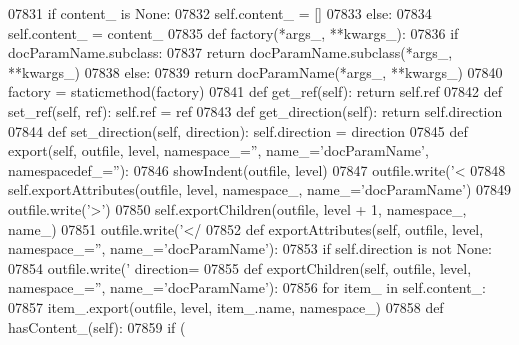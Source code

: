 \begin{DoxyCode}
{{{{{{{{{{{{{{{{{{{{{{{{{{{{{{{{{{{{{{{{{{{{{{{{{{{{{{{{{{{{{{{{{{{{{{{{{{{{{{{{{{{{{{{{{{{{{{{{{{{{{{{{{{{{{{{{{{{{{{{{{{{{{{{{{{{{{{{{{{{{{{{{{{{{{{{{{{{{{{{{{{{{{{{{{{{{{{{{{{{{{{{{{{{{{{{{{{{{{{{{{{{{{{{{{{{{{{{{{{{{{{{{{{{{{{{{{{{{{{{{{{{{{{{{{{{{{{{{{{{{{{{{{{{{{{{{{{{{{{{{{{{{{{{{{{{{{{{{{{{{{{{{{{{{{{{{{{{{{{{{{{{{{{{{{{{{{{{{{{{{{{{{{{{{{{{{{{{{{{{{{{{{{{{{{{{{{{{{{{{{{{{{{{{{{{{{{{{{{{{{{{{{{{{{{{{{{{{{{{{{{{{{{{{{{{{{{{{{{{{{{{{{{{{{{{{{{{{{{{{{{{{{{{{{{{{{{{{{{{{{{{07831         \textcolor{keywordflow}{if} content\_ \textcolor{keywordflow}{is} \textcolor{keywordtype}{None}:
07832             self.content_ = []
07833         \textcolor{keywordflow}{else}:
07834             self.content_ = content\_
07835     \textcolor{keyword}{def }factory(*args\_, **kwargs\_):
07836         \textcolor{keywordflow}{if} docParamName.subclass:
07837             \textcolor{keywordflow}{return} docParamName.subclass(*args\_, **kwargs\_)
07838         \textcolor{keywordflow}{else}:
07839             \textcolor{keywordflow}{return} docParamName(*args\_, **kwargs\_)
07840     factory = staticmethod(factory)
07841     \textcolor{keyword}{def }get_ref(self): \textcolor{keywordflow}{return} self.ref
07842     \textcolor{keyword}{def }set_ref(self, ref): self.ref = ref
07843     \textcolor{keyword}{def }get_direction(self): \textcolor{keywordflow}{return} self.direction
07844     \textcolor{keyword}{def }set_direction(self, direction): self.direction = direction
07845     \textcolor{keyword}{def }export(self, outfile, level, namespace\_='', name\_='docParamName', namespacedef\_=''):
07846         showIndent(outfile, level)
07847         outfile.write(\textcolor{stringliteral}{'<%
07848         self.exportAttributes(outfile, level, namespace\_, name\_=\textcolor{stringliteral}{'docParamName'})
07849         outfile.write(\textcolor{stringliteral}{'>'})
07850         self.exportChildren(outfile, level + 1, namespace\_, name\_)
07851         outfile.write(\textcolor{stringliteral}{'</%
07852     \textcolor{keyword}{def }exportAttributes(self, outfile, level, namespace\_='', name\_='docParamName'):
07853         \textcolor{keywordflow}{if} self.direction \textcolor{keywordflow}{is} \textcolor{keywordflow}{not} \textcolor{keywordtype}{None}:
07854             outfile.write(\textcolor{stringliteral}{' direction=%
07855     \textcolor{keyword}{def }exportChildren(self, outfile, level, namespace\_='', name\_='docParamName'):
07856         \textcolor{keywordflow}{for} item\_ \textcolor{keywordflow}{in} self.content_:
07857             item\_.export(outfile, level, item\_.name, namespace\_)
07858     \textcolor{keyword}{def }hasContent_(self):
07859         \textcolor{keywordflow}{if} (
}}}}}}}}}}}}}}}}}}}}}}}}}}}}}}}}}}}}}}}}}}}}}}}}}}}}}}}}}}}}}}}}}}}}}}}}}}}}}}}}}}}}}}}}}}}}}}}}}}}}}}}}}}}}}}}}}}}}}}}}}}}}}}}}}}}}}}}}}}}}}}}}}}}}}}}}}}}}}}}}}}}}}}}}}}}}}}}}}}}}}}}}}}}}}}}}}}}}}}}}}}}}}}}}}}}}}}}}}}}}}}}}}}}}}}}}}}}}}}}}}}}}}}}}}}}}}}}}}}}}}}}}}}}}}}}}}}}}}}}}}}}}}}}}}}}}}}}}}}}}}}}}}}}}}}}}}}}}}}}}}}}}}}}}}}}}}}}}}}}}}}}}}}}}}}}}}}}}}}}}}}}}}}}}}}}}}}}}}}}}}}}}}}}}}}}}}}}}}}}}}}}}}}}}}}}}}}}}}}}}}}}}}}}}}}}}}}}}}}}}}}}}}}}}}}}}}}}}}}}}}}}}}}}}}}}}}}}}}}}}}}}}}
\end{DoxyCode}

